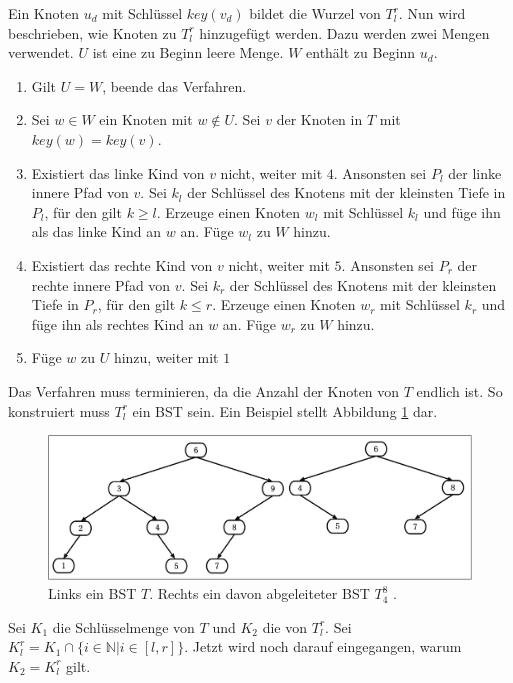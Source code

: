 \documentclass[a4paper,12pt]{article}
\begin{document}
\noindent Ein Knoten $u_d$ mit Schlüssel $\mathit{key}(v_d)$ bildet die Wurzel von $T^r_l$. Nun wird beschrieben, wie Knoten zu $T^r_l$ hinzugefügt werden.
Dazu werden zwei Mengen verwendet. $U$ ist eine zu Beginn leere Menge. $W$ enthält zu Beginn $u_d$.
\begin{enumerate}
	\item Gilt $U = W$, beende das Verfahren.
	\item Sei $w \in W$ ein Knoten mit $w \notin U$.  Sei $v$ der Knoten in $T$ mit \mbox{$\mathit{key}(w ) = \mathit{key}(v)$}.  
	\item Existiert das linke Kind von $v$ nicht, weiter mit $4$. Ansonsten sei  $P_l$ der linke innere Pfad von $v$. Sei $k_l$ der Schlüssel des Knotens mit der kleinsten Tiefe in $P_l$, für den gilt $k \geq l$. Erzeuge einen Knoten $w_l$ mit Schlüssel $k_l$ und füge ihn als das linke Kind an $w$ an. Füge $w_l$ zu $W$ hinzu.
	\item Existiert das rechte Kind von $v$ nicht, weiter mit $5$. Ansonsten sei $P_r$ der rechte innere Pfad von $v$. Sei $k_r$ der Schlüssel des Knotens mit der kleinsten Tiefe in $P_r$, für den gilt  $k \leq r$. Erzeuge einen Knoten $w_r$ mit Schlüssel $k_r$ und füge ihn als rechtes Kind an $w$ an. Füge $w_r$ zu $W$ hinzu.	
	\item Füge $w$ zu $U$ hinzu, weiter mit $1$
\end{enumerate}
Das Verfahren muss terminieren, da die Anzahl der Knoten von $T$ endlich ist. So konstruiert muss $T^r_l$ ein BST sein. Ein Beispiel stellt Abbildung \ref{fig:T_r_l} dar. 
\begin{figure}[H]
	\centering
	\includegraphics[width= 1\textwidth]{Medien/DynOpt/T_r_l}
	\caption{Links ein BST $T$. Rechts ein davon abgeleiteter BST $T^8_4$ .  }
	\label{fig:T_r_l}
\end{figure}

\noindent Sei $K_1$ die Schlüsselmenge von $T$ und $K_2$ die von $T^r_l$. Sei ${K^r_l = K_1 \cap \{i \in \mathbb{N}\vert i \in \left[l,r\right] \}}$. Jetzt wird noch darauf eingegangen, warum $K_2 = K^r_l$ gilt. \\
\end{document}

